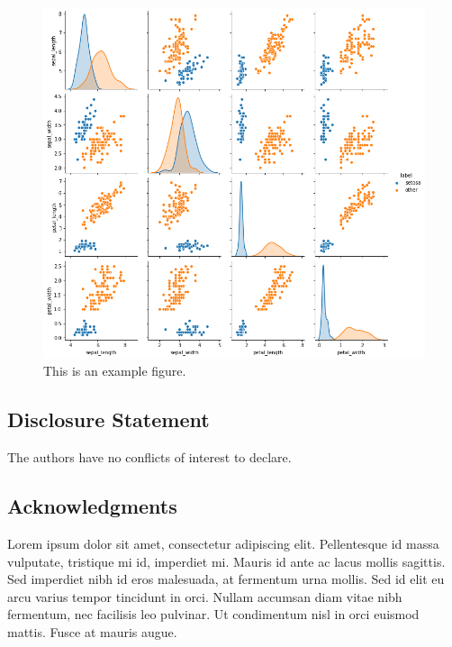 \documentclass[
]{hdsr}
\begin{document}
\begin{figure}

{\centering \includegraphics{figs/iris_pairs.png}

}

\caption{\label{fig-my-label}This is an example figure.}

\end{figure}

\hypertarget{disclosure-statement}{%
\subsection*{Disclosure Statement}\label{disclosure-statement}}

The authors have no conflicts of interest to declare.

\hypertarget{acknowledgments}{%
\subsection*{Acknowledgments}\label{acknowledgments}}

Lorem ipsum dolor sit amet, consectetur adipiscing elit. Pellentesque id
massa vulputate, tristique mi id, imperdiet mi. Mauris id ante ac lacus
mollis sagittis. Sed imperdiet nibh id eros malesuada, at fermentum urna
mollis. Sed id elit eu arcu varius tempor tincidunt in orci. Nullam
accumsan diam vitae nibh fermentum, nec facilisis leo pulvinar. Ut
condimentum nisl in orci euismod mattis. Fusce at mauris augue.
\end{document}
